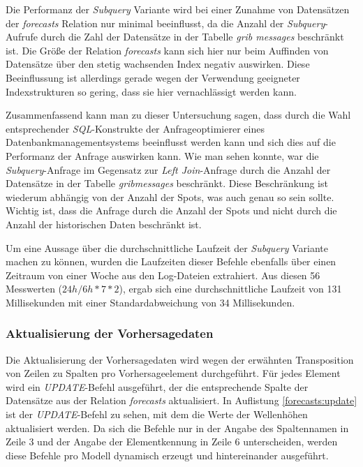 Die Performanz der \textit{Subquery} Variante wird bei einer Zunahme
von Datensätzen der \textit{forecasts} Relation nur minimal
beeinflusst, da die Anzahl der \textit{Subquery}-Aufrufe durch die
Zahl der Datensätze in der Tabelle \textit{grib\textunderscore
  messages} beschränkt ist. Die Größe der Relation \textit{forecasts}
kann sich hier nur beim Auffinden von Datensätze über den stetig
wachsenden Index negativ auswirken. Diese Beeinflussung ist allerdings
gerade wegen der Verwendung geeigneter Indexstrukturen so gering, dass
sie hier vernachlässigt werden kann.

Zusammenfassend kann man zu dieser Untersuchung sagen, dass durch die
Wahl entsprechender \textit{SQL}-Konstrukte der Anfrageoptimierer
eines Datenbankmanagementsystems beeinflusst werden kann und sich dies
auf die Performanz der Anfrage auswirken kann. Wie man sehen konnte,
war die \textit{Subquery}-Anfrage im Gegensatz zur \textit{Left
  Join}-Anfrage durch die Anzahl der Datensätze in der Tabelle
\textit{grib\textunderscore messages} beschränkt. Diese Beschränkung
ist wiederum abhängig von der Anzahl der Spots, was auch genau so sein
sollte. Wichtig ist, dass die Anfrage durch die Anzahl der Spots und
nicht durch die Anzahl der historischen Daten beschränkt ist.

Um eine Aussage über die durchschnittliche Laufzeit der
\textit{Subquery} Variante machen zu können, wurden die Laufzeiten
dieser Befehle ebenfalls über einen Zeitraum von einer Woche aus den
Log-Dateien extrahiert. Aus diesen 56 Messwerten ($24h/6h * 7 * 2$),
ergab sich eine durchschnittliche Laufzeit von 131 Millisekunden mit
einer Standardabweichung von 34 Millisekunden.

\subsubsection{Aktualisierung der Vorhersagedaten}
Die Aktualisierung der Vorhersagedaten wird wegen der erwähnten
Transposition von Zeilen zu Spalten pro Vorhersageelement
durchgeführt. Für jedes Element wird ein \textit{UPDATE}-Befehl
ausgeführt, der die entsprechende Spalte der Datensätze aus der
Relation \textit{forecasts} aktualisiert. In Auflistung
\ref{forecasts:update} ist der \textit{UPDATE}-Befehl zu sehen, mit
dem die Werte der Wellenhöhen aktualisiert werden. Da sich die Befehle
nur in der Angabe des Spaltennamen in Zeile 3 und der Angabe der
Elementkennung in Zeile 6 unterscheiden, werden diese Befehle pro
Modell dynamisch erzeugt und hintereinander ausgeführt.

